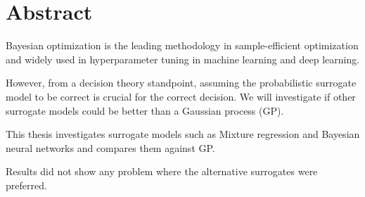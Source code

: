 \section*{Abstract}
Bayesian optimization is the leading methodology in sample-efficient optimization and
widely used in hyperparameter tuning in machine learning and deep learning. 

However, from a decision theory standpoint, assuming the probabilistic surrogate model to be correct
is crucial for the correct decision. We will investigate if other surrogate models could be better
than a Gaussian process (GP). 

This thesis investigates surrogate models such as Mixture regression and Bayesian neural networks
and compares them against GP. 

Results did not show any problem where the alternative surrogates were preferred. 





